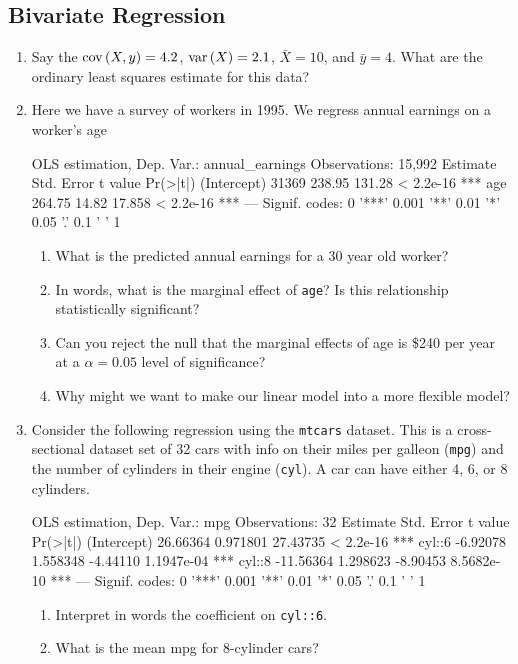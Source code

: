 \documentclass[12pt]{article}
\begin{document}
\subsection*{Bivariate Regression}
\begin{enumerate}
  \item Say the $\cov{X, y} = 4.2$, $\var{X} = 2.1$, $\bar{X} = 10$, and $\bar{y} = 4$. What are the ordinary least squares estimate for this data?
  
  \item Here we have a survey of workers in 1995. We regress annual earnings on a worker's age
  
  \begin{codeblock}[{}]
OLS estimation, Dep. Var.: annual_earnings
Observations: 15,992
             Estimate  Std. Error   t value   Pr(>|t|)    
(Intercept)     31369      238.95    131.28  < 2.2e-16 ***
age            264.75       14.82    17.858  < 2.2e-16 ***
---
Signif. codes:  0 '***' 0.001 '**' 0.01 '*' 0.05 '.' 0.1 ' ' 1
  \end{codeblock}

  \begin{enumerate}
    \item What is the predicted annual earnings for a 30 year old worker?

    \item In words, what is the marginal effect of \texttt{age}? Is this relationship statistically significant?
    
    \item Can you reject the null that the marginal effects of age is \$240 per year at a $\alpha = 0.05$ level of significance?
    
    \item Why might we want to make our linear model into a more flexible model?
  \end{enumerate}
  
  \item Consider the following regression using the \texttt{mtcars} dataset. This is a cross-sectional dataset set of 32 cars with info on their miles per galleon (\texttt{mpg}) and the number of cylinders in their engine (\texttt{cyl}). A car can have either 4, 6, or 8 cylinders.

  \begin{codeblock}[{}]
OLS estimation, Dep. Var.: mpg
Observations: 32
             Estimate  Std. Error   t value    Pr(>|t|)    
(Intercept)  26.66364    0.971801  27.43735   < 2.2e-16 ***
cyl::6       -6.92078    1.558348  -4.44110  1.1947e-04 ***
cyl::8      -11.56364    1.298623  -8.90453  8.5682e-10 ***   
---
Signif. codes:  0 '***' 0.001 '**' 0.01 '*' 0.05 '.' 0.1 ' ' 1
  \end{codeblock}

  \begin{enumerate}
    \item Interpret in words the coefficient on \texttt{cyl::6}. 
    
    \item What is the mean mpg for 8-cylinder cars?
  \end{enumerate}
\end{enumerate}
\end{document}
